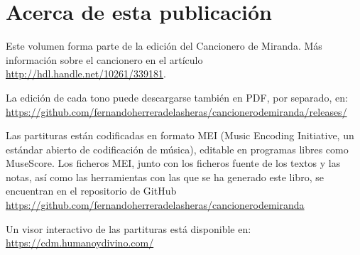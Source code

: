 \section*{\centering\LARGE{Acerca de esta publicación}}

\vspace{0.5cm}

Este volumen forma parte de la edición del Cancionero de Miranda. Más información sobre el cancionero en el artículo \url{http://hdl.handle.net/10261/339181}.

\vspace{0.5cm}

La edición de cada tono puede descargarse también en PDF, por separado, en: \url{https://github.com/fernandoherreradelasheras/cancionerodemiranda/releases/}

\vspace{0.5cm}

Las partituras están codificadas en formato MEI (Music Encoding Initiative, un estándar abierto de codificación de música), editable en programas libres como MuseScore. Los ficheros MEI, junto con los ficheros fuente de los textos y las notas, así como las herramientas con las que se ha generado este libro, se encuentran en el repositorio de GitHub \url{https://github.com/fernandoherreradelasheras/cancionerodemiranda}

\vspace{0.5cm}

Un visor interactivo de las partituras está disponible en: \url{https://cdm.humanoydivino.com/}
